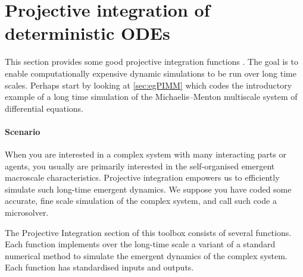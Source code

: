 \section{Projective integration of deterministic ODEs}
\label{sec:ProjInt}
\localtableofcontents

This section provides some good projective integration functions \cite[e.g.]{Gear02b, Gear03c, Givon06, Sieber2018}.
The goal is to enable computationally expensive dynamic simulations to be run over long time scales.
Perhaps start by looking at \cref{sec:egPIMM} which codes the introductory example of a long time simulation of the Michaelis--Menton multiscale system of differential equations.

\paragraph{Scenario}
When you are interested in a complex system with many interacting parts or agents, you usually are primarily interested in the self-organised emergent macroscale characteristics.
Projective integration empowers us to efficiently simulate such long-time emergent dynamics.
We suppose you have coded some accurate, fine scale simulation of the complex system, and call such code a microsolver.

The Projective Integration section of this toolbox consists of several functions.
Each function implements over the long-time scale a variant of a standard numerical method to simulate the emergent dynamics of the complex system.
Each function has standardised inputs and outputs.

